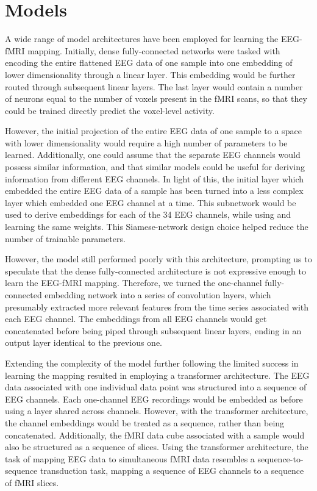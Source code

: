 \documentclass{article}
\begin{document}
\section{Models}

A wide range of model architectures have been employed for learning the EEG-fMRI mapping. Initially, dense fully-connected networks were tasked with encoding the entire flattened EEG data of one sample into one embedding of lower dimensionality through a linear layer. This embedding would be further routed through subsequent linear layers. The last layer would contain a number of neurons equal to the number of voxels present in the fMRI scans, so that they could be trained directly predict the voxel-level activity.

However, the initial projection of the entire EEG data of one sample to a space with lower dimensionality would require a high number of parameters to be learned. Additionally, one could assume that the separate EEG channels would possess similar information, and that similar models could be useful for deriving information from different EEG channels. In light of this, the initial layer which embedded the entire EEG data of a sample has been turned into a less complex layer which embedded one EEG channel at a time. This subnetwork would be used to derive embeddings for each of the 34 EEG channels, while using and learning the same weights. This Siamese-network design choice helped reduce the number of trainable parameters.

However, the model still performed poorly with this architecture, prompting us to speculate that the dense fully-connected architecture is not expressive enough to learn the EEG-fMRI mapping. Therefore, we turned the one-channel fully-connected embedding network into a series of convolution layers, which presumably extracted more relevant features from the time series associated with each EEG channel. The embeddings from all EEG channels would get concatenated before being piped through subsequent linear layers, ending in an output layer identical to the previous one.

Extending the complexity of the model further following the limited success in learning the mapping resulted in employing a transformer architecture. The EEG data associated with one individual data point was structured into a sequence of EEG channels. Each one-channel EEG recordings would be embedded as before using a layer shared across channels. However, with the transformer architecture, the channel embeddings would be treated as a sequence, rather than being concatenated. Additionally, the fMRI data cube associated with a sample would also be structured as a sequence of slices. Using the transformer architecture, the task of mapping EEG data to simultaneous fMRI data resembles a sequence-to-sequence transduction task, mapping a sequence of EEG channels to a sequence of fMRI slices.
\end{document}
